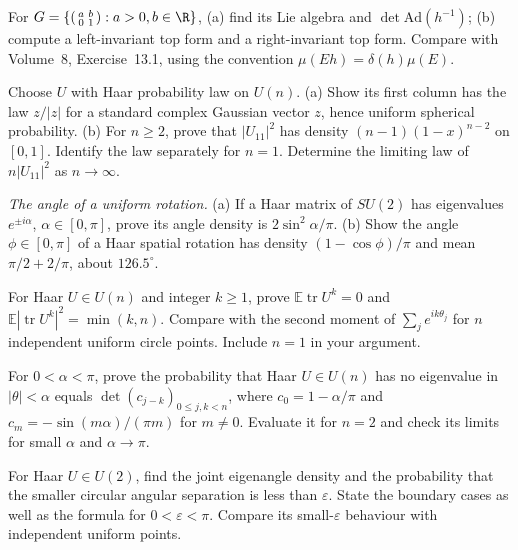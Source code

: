 \begin{exercise}[$\star$]\label{ex:axbmodular}
For $G=\{\left(\begin{smallmatrix}a&b\\0&1\end{smallmatrix}\right):a>0,b\in\R\}$,
(a) find its Lie algebra and $\det\mathrm{Ad}(h^{-1})$;
(b) compute a left-invariant top form and a right-invariant top form.
Compare with Volume~8, Exercise~13.1, using the convention
$\mu(Eh)=\delta(h)\mu(E)$.
\end{exercise}
\begin{exercise}[$\star\star$]\label{ex:firstcolumn}
Choose $U$ with Haar probability law on $U(n)$.
(a) Show its first column has the law $z/|z|$ for a standard complex
Gaussian vector $z$, hence uniform spherical probability.
(b) For $n\ge2$, prove that $|U_{11}|^2$ has density
$(n-1)(1-x)^{n-2}$ on $[0,1]$. Identify the law separately for $n=1$.
Determine the limiting law of $n|U_{11}|^2$ as $n\to\infty$.
\end{exercise}
\begin{exercise}[$\star\star$]\label{ex:su2weyl}
\emph{The angle of a uniform rotation.}
(a) If a Haar matrix of $SU(2)$ has eigenvalues $e^{\pm i\alpha}$,
$\alpha\in[0,\pi]$, prove its angle density is $2\sin^2\alpha/\pi$.
(b) Show the angle $\phi\in[0,\pi]$ of a Haar spatial rotation has
density $(1-\cos\phi)/\pi$ and mean $\pi/2+2/\pi$, about $126.5^\circ$.
\end{exercise}
\begin{exercise}[$\star\star$]\label{ex:tracemoments}
For Haar $U\in U(n)$ and integer $k\ge1$, prove
$\mathbb E\operatorname{tr}U^k=0$ and
$\mathbb E|\operatorname{tr}U^k|^2=\min(k,n)$.
Compare with the second moment of $\sum_je^{ik\theta_j}$ for $n$
independent uniform circle points. Include $n=1$ in your argument.
\end{exercise}
\begin{exercise}[$\star\star$]\label{ex:gap}
For $0<\alpha<\pi$, prove the probability that Haar $U\in U(n)$ has
no eigenvalue in $|\theta|<\alpha$ equals
$\det(c_{j-k})_{0\le j,k<n}$, where
$c_0=1-\alpha/\pi$ and $c_m=-\sin(m\alpha)/(\pi m)$ for $m\ne0$.
Evaluate it for $n=2$ and check its limits for small $\alpha$ and
$\alpha\to\pi$.
\end{exercise}
\begin{exercise}[$\star$]\label{ex:repulsion}
For Haar $U\in U(2)$, find the joint eigenangle density and the probability
that the smaller circular angular separation is less than $\varepsilon$.
State the boundary cases as well as the formula for $0<\varepsilon<\pi$.
Compare its small-$\varepsilon$ behaviour with independent uniform points.
\end{exercise}

